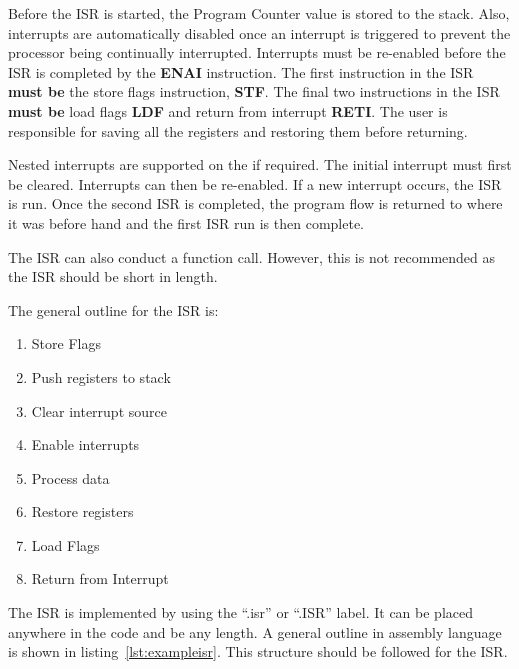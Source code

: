 Before the ISR is started, the Program Counter value is stored to the stack. 
Also, interrupts are automatically disabled once an interrupt is triggered to prevent the processor being continually interrupted.
Interrupts must be re-enabled before the ISR is completed by the \textbf{ENAI} instruction.
The first instruction in the ISR \textbf{must be} the store flags instruction, \textbf{STF}. 
The final two instructions in the ISR \textbf{must be} load flags \textbf{LDF} and return from interrupt \textbf{RETI}. 
The user is responsible for saving all the registers and restoring them before returning. 

Nested interrupts are supported on the \samurai{} if required. 
The initial interrupt must first be cleared. 
Interrupts can then be re-enabled. 
If a new interrupt occurs, the ISR is run. 
Once the second ISR is completed, the program flow is returned to where it was before hand and the first ISR run is then complete.

The ISR can also conduct a function call. 
However, this is not recommended as the ISR should be short in length.

The general outline for the ISR is:
\begin{enumerate}
\item Store Flags
\item Push registers to stack
\item Clear interrupt source
\item Enable interrupts
\item Process data
\item Restore registers
\item Load Flags
\item Return from Interrupt
\end{enumerate}

The ISR is implemented by using the ``.isr'' or ``.ISR'' label. 
It can be placed anywhere in the code and be any length.
A general outline in assembly language is shown in listing~\ref{lst:exampleisr}. 
This structure should be followed for the ISR.






